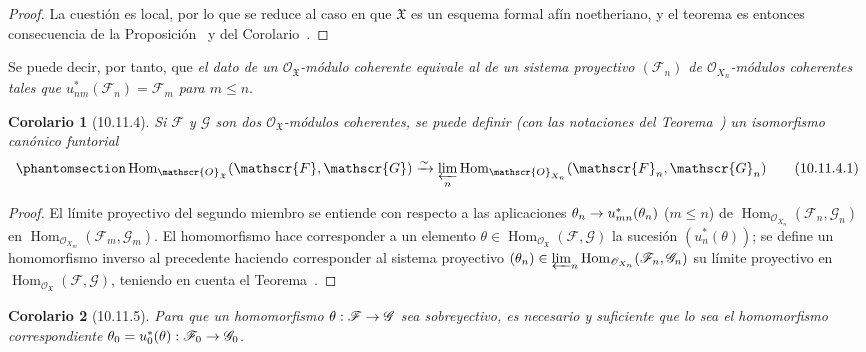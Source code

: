 \documentclass[oneside]{amsart}
\theoremstyle{ega-env-style}
\theoremstyle{ega-thm-env-style}
\newtheorem*{corollary}{Corolario}
\theoremstyle{ega-defn-env-style}
\def\leq{\leqslant}                 %
\renewcommand{\to}{\mathchoice{\longrightarrow}{\rightarrow}{\rightarrow}{\rightarrow}}
\let\EGAOriginalLabel\label
\renewcommand{\label}[1]{\phantomsection\EGAOriginalLabel{#1}}
\begin{document}
\begin{proof}
La cuestión es local, por lo que se reduce al caso en que $\mathfrak{X}$ es un esquema formal afín noetheriano, y el teorema es entonces consecuencia de la Proposición~ y del Corolario~.
\end{proof}

Se puede decir, por tanto, que \emph{el dato de un $\mathscr{O}_{\mathfrak{X}}$-módulo coherente equivale al de un sistema proyectivo $(\mathscr{F}_n)$ de $\mathscr{O}_{X_n}$-módulos coherentes tales que $u_{nm}^*(\mathscr{F}_n)=\mathscr{F}_m$ para $m\leq n$}.

\begin{corollary}[10.11.4]
\label{I.10.11.4}
Si $\mathscr{F}$ y $\mathscr{G}$ son dos $\mathscr{O}_{\mathfrak{X}}$-módulos coherentes, se puede definir \textup{(con las notaciones del Teorema~)} un isomorfismo canónico funtorial
\[
  \label{I.10.11.4.1-fr}
  \operatorname{Hom}_{\mathscr{O}_{\mathfrak{X}}}
  (\mathscr{F},\mathscr{G})
  \xrightarrow{\sim}
  \varprojlim_n
  \operatorname{Hom}_{\mathscr{O}_{X_n}}
  (\mathscr{F}_n,\mathscr{G}_n)
  \tag{10.11.4.1}
\]
\end{corollary}

\begin{proof}
El límite proyectivo del segundo miembro se entiende con respecto a las aplicaciones $\theta_n\to u_{mn}^*(\theta_n)$ ($m\leq n$) de $\operatorname{Hom}_{\mathscr{O}_{X_n}}
(\mathscr{F}_n,\mathscr{G}_n)$ en $\operatorname{Hom}_{\mathscr{O}_{X_m}}
(\mathscr{F}_m,\mathscr{G}_m)$.
El homomorfismo  hace corresponder a un elemento $\theta\in\operatorname{Hom}_{\mathscr{O}_{\mathfrak{X}}}
(\mathscr{F},\mathscr{G})$ la sucesión $(u_n^*(\theta))$; se define un homomorfismo inverso al precedente haciendo corresponder al sistema proyectivo $(\theta_n)\in\varprojlim_n
\operatorname{Hom}_{\mathscr{O}_{X_n}}
(\mathscr{F}_n,\mathscr{G}_n)$ su límite proyectivo en $\operatorname{Hom}_{\mathscr{O}_{\mathfrak{X}}}
(\mathscr{F},\mathscr{G})$, teniendo en cuenta el Teorema~.
\end{proof}

\begin{corollary}[10.11.5]
\label{I.10.11.5}
Para que un homomorfismo $\theta:\mathscr{F}\to\mathscr{G}$ sea sobreyectivo, es necesario y suficiente que lo sea el homomorfismo correspondiente $\theta_0=u_0^*(\theta):\mathscr{F}_0\to\mathscr{G}_0$.
\end{corollary}
\end{document}
